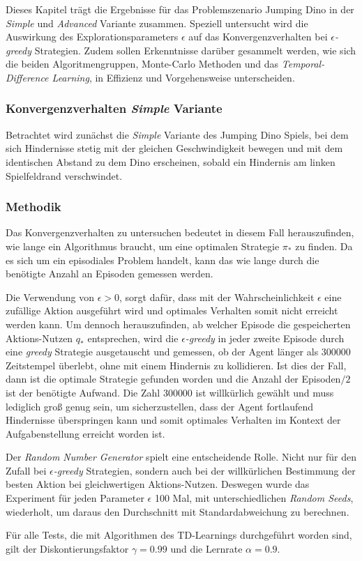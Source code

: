 Dieses Kapitel trägt die Ergebnisse für das Problemszenario Jumping Dino in der \textit{Simple} und \textit{Advanced} Variante zusammen. Speziell untersucht wird die Auswirkung des Explorationsparameters $\epsilon$ auf das Konvergenzverhalten bei $\epsilon$\textit{-greedy} Strategien. Zudem sollen Erkenntnisse darüber gesammelt werden, wie sich die beiden Algoritmengruppen, Monte-Carlo Methoden und das \textit{Temporal-Difference Learning}, in Effizienz und Vorgehensweise unterscheiden.


\subsubsection{Konvergenzverhalten \textit{Simple} Variante}\label{sec:resJumpSimple}
Betrachtet wird zunächst die \textit{Simple} Variante des Jumping Dino Spiels, bei dem sich Hindernisse stetig mit der gleichen Geschwindigkeit bewegen und mit dem identischen Abstand zu dem Dino erscheinen, sobald ein Hindernis am linken Spielfeldrand verschwindet.

\subsubsection*{Methodik}
 Das Konvergenzverhalten zu untersuchen bedeutet in diesem Fall herauszufinden, wie lange ein Algorithmus braucht, um eine optimalen Strategie $\pi_*$ zu finden. Da es sich um ein episodiales Problem handelt, kann das \glqq wie lange\grqq{} durch die benötigte Anzahl an Episoden gemessen werden. 
\par
Die Verwendung von $\epsilon > 0$, sorgt dafür, dass mit der Wahrscheinlichkeit $\epsilon$ eine zufällige Aktion ausgeführt wird und optimales Verhalten somit nicht erreicht werden kann. Um dennoch herauszufinden, ab welcher Episode die gespeicherten Aktions-Nutzen $q_*$ entsprechen, wird die $\epsilon$\textit{-greedy} in jeder zweite Episode durch eine \textit{greedy} Strategie ausgetauscht und gemessen, ob der Agent länger als 300000 Zeitstempel überlebt, ohne mit einem Hindernis zu kollidieren. Ist dies der Fall, dann ist die optimale Strategie gefunden worden und die Anzahl der Episoden$/2$ ist der benötigte Aufwand. Die Zahl 300000 ist willkürlich gewählt und muss lediglich groß genug sein, um sicherzustellen, dass der Agent fortlaufend Hindernisse überspringen kann und somit optimales Verhalten im Kontext der Aufgabenstellung erreicht worden ist.  
\par 
Der \textit{Random Number Generator} spielt eine entscheidende Rolle. Nicht nur für den Zufall bei $\epsilon$\textit{-greedy} Strategien, sondern auch bei der willkürlichen Bestimmung der besten Aktion bei gleichwertigen Aktions-Nutzen. Deswegen wurde das Experiment für jeden Parameter $\epsilon$ 100 Mal, mit unterschiedlichen \textit{Random Seeds}, wiederholt, um daraus den Durchschnitt mit Standardabweichung zu berechnen.
\par 
Für alle Tests, die mit Algorithmen des TD-Learnings durchgeführt worden sind, gilt der Diskontierungsfaktor $\gamma = 0.99$ und die Lernrate $\alpha = 0.9$.
\par 

